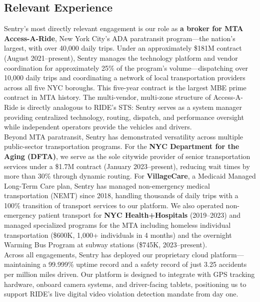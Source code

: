 \subsection{Relevant Experience}

Sentry's most directly relevant engagement is our role as \textbf{a broker for MTA Access-A-Ride}, New York City's ADA paratransit program---the nation's largest, with over 40,000 daily trips. Under an approximately \$181M contract (August 2021--present), Sentry manages the technology platform and vendor coordination for approximately 25\% of the program's volume---dispatching over 10,000 daily trips and coordinating a network of local transportation providers across all five NYC boroughs. This five-year contract is the largest MBE prime contract in MTA history. The multi-vendor, multi-zone structure of Access-A-Ride is directly analogous to RIDE's STS: Sentry serves as a system manager providing centralized technology, routing, dispatch, and performance oversight while independent operators provide the vehicles and drivers.\\

Beyond MTA paratransit, Sentry has demonstrated versatility across multiple public-sector transportation programs. For the \textbf{NYC Department for the Aging (DFTA)}, we serve as the sole citywide provider of senior transportation services under a \$1.7M contract (January 2023--present), reducing wait times by more than 30\% through dynamic routing. For \textbf{VillageCare}, a Medicaid Managed Long-Term Care plan, Sentry has managed non-emergency medical transportation (NEMT) since 2018, handling thousands of daily trips with a 100\% transition of transport services to our platform. We also operated non-emergency patient transport for \textbf{NYC Health+Hospitals} (2019--2023) and managed specialized programs for the MTA including homeless individual transportation (\$600K, 1,000+ individuals in 4 months) and the overnight Warming Bus Program at subway stations (\$745K, 2023--present).\\

Across all engagements, Sentry has deployed our proprietary cloud platform---maintaining a 99.999\% uptime record and a safety record of just 3.25 accidents per million miles driven. Our platform is designed to integrate with GPS tracking hardware, onboard camera systems, and driver-facing tablets, positioning us to support RIDE's live digital video violation detection mandate from day one.

